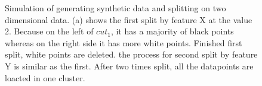 \documentclass[conference]{IEEEtran}
\begin{document}


%

\begin{figure}[!t]
\centering
{}
\hfil
{}
\hfil
{}
\hfil
{}
\caption{Simulation of generating synthetic data and splitting on two dimensional data. (a) shows the first split by feature X at the value 2. 
Because on the left of $cut_1$, it has a majority of black points whereas on the right side it has more white points. 
Finished first split, white points are deleted. the process for second split by feature Y is similar as the first. After two times split, all the datapoints are loacted in one cluster.}
\label{fig_sim}
\end{figure}
\end{document}
